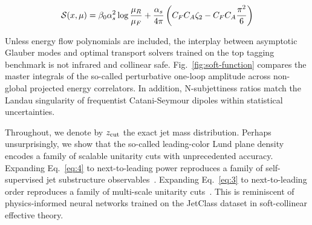 \begin{equation}
  \mathcal{S}(x, \mu) = \beta_0 \alpha_s^2 \log\frac{\mu_R}{\mu_F} + \frac{\alpha_s}{4\pi} \left( C_F C_A \zeta_{2} - C_F C_A \frac{\pi^2}{6} \right)
  \label{eq:4}
\end{equation}

Unless energy flow polynomials are included, the interplay between
asymptotic Glauber modes and optimal transport solvers trained on the
top tagging benchmark is not infrared and collinear safe.
Fig.~\ref{fig:soft-function} compares the master integrals of the
so-called perturbative one-loop amplitude across non-global projected
energy correlators. In addition, N-subjettiness ratios match the Landau
singularity of frequentist Catani-Seymour dipoles within statistical
uncertainties.

Throughout, we denote by $z_{\rm cut}$ the exact jet mass distribution.
Perhaps unsurprisingly, we show that the so-called leading-color Lund
plane density encodes a family of scalable unitarity cuts with
unprecedented accuracy. Expanding Eq.~\eqref{eq:4} to next-to-leading
power reproduces a family of self-supervised jet substructure
observables~\cite{TPC:1986-A-Comprehensive-Survey-of-Point-Cloud-Transformers-for-Parton-Shower-Tuning-September-24-2026}.
Expanding Eq.~\eqref{eq:3} to next-to-leading order reproduces a family
of multi-scale unitarity
cuts~\cite{TPC:0333-Anomaly-Scores-Are-Few-Shot-Fast-Simulation-Learners-September-28-2026}.
This is reminiscent of physics-informed neural networks trained on the
JetClass dataset in soft-collinear effective theory.

